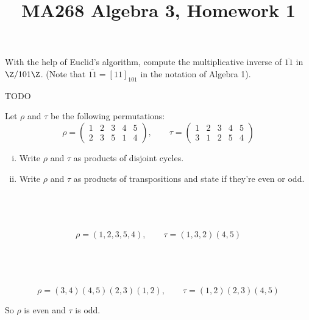 \documentclass[a4paper]{article}
\title{MA268 Algebra 3, Homework 1}
\begin{document}
\maketitle

\setlength{\parindent}{0em}
\setlength{\parskip}{1em}


\begin{questionbody}
With the help of Euclid's algorithm, compute the multiplicative inverse of $\overline{11}$ in $\Z / 101\Z$. (Note that $\overline{11} = [11]_{101}$ in the notation of Algebra 1).
\end{questionbody}

TODO


\renewcommand{\thesubsection}{Q\arabic{section}~(\roman{subsection})}

\begin{questionbody}
Let $\rho$ and $\tau$ be the following permutations: \[
\rho = \begin{pmatrix}
1 & 2 & 3 & 4 & 5 \\
2 & 3 & 5 & 1 & 4
\end{pmatrix}, \qquad \tau = \begin{pmatrix}
1 & 2 & 3 & 4 & 5 \\
3 & 1 & 2 & 5 & 4
\end{pmatrix}
\]
\begin{enumerate}[(i)]
\item Write $\rho$ and $\tau$ as products of disjoint cycles.
\item Write $\rho$ and $\tau$ as products of transpositions and state if they're even or odd.
\end{enumerate}
\end{questionbody}

\subsection{~} %

\[ \rho = (1, 2, 3, 5, 4), \qquad \tau = (1, 3, 2) (4, 5) \]

\subsection{~} %

\[ \rho = (3, 4) (4, 5) (2, 3) (1, 2), \qquad \tau = (1, 2) (2, 3) (4, 5) \]

So $\rho$ is even and $\tau$ is odd.
\end{document}
